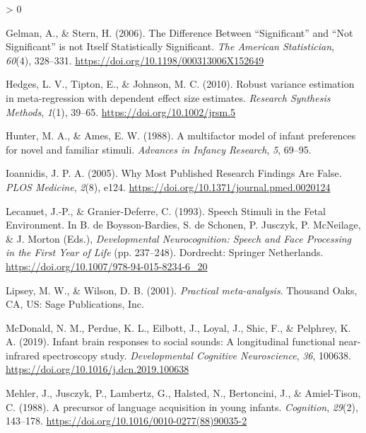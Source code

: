 \documentclass[
  english,
  man]{apa6}
\newlength{\cslhangindent}
\newenvironment{CSLReferences}[2] %
 {%
  \setlength{\parindent}{0pt}
  \ifodd #1 \everypar{\setlength{\hangindent}{\cslhangindent}}\ignorespaces\fi
  \ifnum #2 > 0
  \setlength{\parskip}{#2\baselineskip}
  \fi
 }%
 {}
\begin{document}
\begin{CSLReferences}{1}{0}
\leavevmode\hypertarget{ref-gelman_difference_2006}{}%
Gelman, A., \& Stern, H. (2006). The {Difference} {Between} {``{Significant}''} and {``{Not} {Significant}''} is not {Itself} {Statistically} {Significant}. \emph{The American Statistician}, \emph{60}(4), 328--331. \url{https://doi.org/10.1198/000313006X152649}

\leavevmode\hypertarget{ref-hedges_robust_2010}{}%
Hedges, L. V., Tipton, E., \& Johnson, M. C. (2010). Robust variance estimation in meta-regression with dependent effect size estimates. \emph{Research Synthesis Methods}, \emph{1}(1), 39--65. \url{https://doi.org/10.1002/jrsm.5}

\leavevmode\hypertarget{ref-hunter_multifactor_1988}{}%
Hunter, M. A., \& Ames, E. W. (1988). A multifactor model of infant preferences for novel and familiar stimuli. \emph{Advances in Infancy Research}, \emph{5}, 69--95.

\leavevmode\hypertarget{ref-ioannidis_why_2005}{}%
Ioannidis, J. P. A. (2005). Why {Most} {Published} {Research} {Findings} {Are} {False}. \emph{PLOS Medicine}, \emph{2}(8), e124. \url{https://doi.org/10.1371/journal.pmed.0020124}

\leavevmode\hypertarget{ref-lecanuet_speech_1993}{}%
Lecanuet, J.-P., \& Granier-Deferre, C. (1993). Speech {Stimuli} in the {Fetal} {Environment}. In B. de Boysson-Bardies, S. de Schonen, P. Jusczyk, P. McNeilage, \& J. Morton (Eds.), \emph{Developmental {Neurocognition}: {Speech} and {Face} {Processing} in the {First} {Year} of {Life}} (pp. 237--248). Dordrecht: Springer Netherlands. \url{https://doi.org/10.1007/978-94-015-8234-6_20}

\leavevmode\hypertarget{ref-lipsey_practical_2001}{}%
Lipsey, M. W., \& Wilson, D. B. (2001). \emph{Practical meta-analysis}. Thousand Oaks, CA, US: Sage Publications, Inc.

\leavevmode\hypertarget{ref-mcdonald_infant_2019}{}%
McDonald, N. M., Perdue, K. L., Eilbott, J., Loyal, J., Shic, F., \& Pelphrey, K. A. (2019). Infant brain responses to social sounds: {A} longitudinal functional near-infrared spectroscopy study. \emph{Developmental Cognitive Neuroscience}, \emph{36}, 100638. \url{https://doi.org/10.1016/j.dcn.2019.100638}

\leavevmode\hypertarget{ref-mehler_precursor_1988}{}%
Mehler, J., Jusczyk, P., Lambertz, G., Halsted, N., Bertoncini, J., \& Amiel-Tison, C. (1988). A precursor of language acquisition in young infants. \emph{Cognition}, \emph{29}(2), 143--178. \url{https://doi.org/10.1016/0010-0277(88)90035-2}


\end{CSLReferences}
\end{document}
